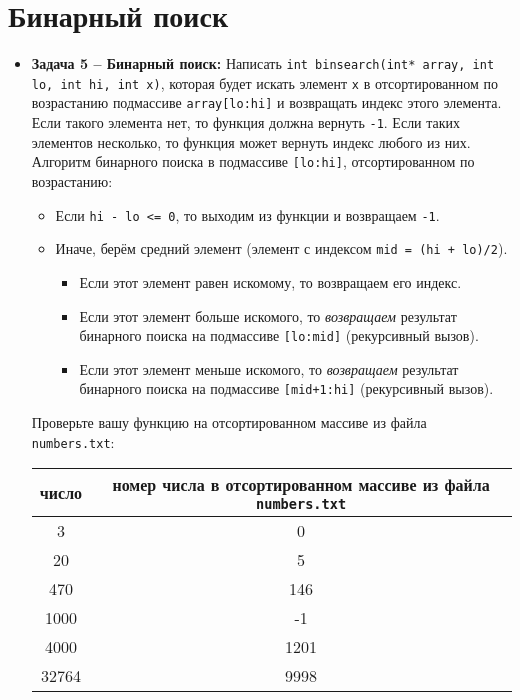 \documentclass{article}
\begin{document}
\section*{Бинарный поиск}
\begin{itemize}


\item \textbf{Задача 5 -- Бинарный поиск:} Написать 
\texttt{int binsearch(int* array, int lo, int hi, int x)}, которая будет искать элемент \texttt{x} в отсортированном по возрастанию подмассиве \texttt{array[lo:hi]} и возвращать индекс этого элемента. Если такого элемента нет, то функция должна вернуть \texttt{-1}. Если таких элементов несколько, то функция может вернуть индекс любого из них.\\
 Алгоритм бинарного поиска в подмассиве \texttt{[lo:hi]}, отсортированном по возрастанию:
\begin{itemize}
\item Если \texttt{hi - lo <= 0}, то выходим из функции и возвращаем \texttt{-1}.
\item Иначе, берём средний элемент (элемент с индексом \texttt{mid = (hi + lo)/2}).
\begin{itemize}
\item Если этот элемент равен искомому, то возвращаем его индекс.
\item Если этот элемент больше искомого, то \textit{возвращаем} результат бинарного поиска на подмассиве \texttt{[lo:mid]} (рекурсивный вызов).
\item Если этот элемент меньше искомого, то \textit{возвращаем} результат бинарного поиска на подмассиве \texttt{[mid+1:hi]} (рекурсивный вызов).
\end{itemize}
\end{itemize}
Проверьте вашу функцию на отсортированном массиве из файла \texttt{numbers.txt}:
\begin{center}
\begin{tabular}{ c c }
 число & номер числа в отсортированном массиве из файла \texttt{numbers.txt} \\ \hline
 3 & 0 \\
 20 & 5  \\ 
 470 & 146 \\  
 1000 & -1 \\  
 4000 & 1201   \\  
 32764 & 9998   \\  
\end{tabular}
\end{center}
\end{itemize}
\end{document}
